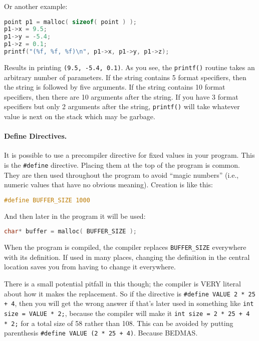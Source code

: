 Or another example:
\begin{lstlisting}[language=C]
point p1 = malloc( sizeof( point ) );
p1->x = 9.5;
p1->y = -5.4;
p1->z = 0.1;
printf("(%f, %f, %f)\n", p1->x, p1->y, p1->z);
\end{lstlisting}

Results in printing \texttt{(9.5, -5.4, 0.1)}. As you see, the \texttt{printf()} routine takes an arbitrary number of parameters. If the string contains 5 format specifiers, then the string is followed by five arguments. If the string contains 10 format specifiers, then there are 10 arguments after the string. If you have 3 format specifiers but only 2 arguments after the string, \texttt{printf()} will take whatever value is next on the stack which may be garbage.

\paragraph{Define Directives.}

It is possible to use a precompiler directive for fixed values in your program. This is the \texttt{\#define} directive. Placing them at the top of the program is common. They are then used throughout the program to avoid ``magic numbers'' (i.e., numeric values that have no obvious meaning). Creation is like this:

\begin{lstlisting}[language=C]
#define BUFFER_SIZE 1000
\end{lstlisting}

And then later in the program it will be used:

\begin{lstlisting}[language=C]
char* buffer = malloc( BUFFER_SIZE );
\end{lstlisting}

When the program is compiled, the compiler replaces \texttt{BUFFER\_SIZE} everywhere with its definition. If used in many places, changing the definition in the central location saves you from having to change it everywhere.

There is a small potential pitfall in this though; the compiler is VERY literal about how it makes the replacement. So if the directive is \texttt{\#define VALUE 2 * 25 + 4}, then you will get the wrong answer if that's later used in something like \texttt{int size = VALUE * 2;}, because the compiler will make it \texttt{int size = 2 * 25 + 4 * 2;} for a total size of 58 rather than 108. This can be avoided by putting parenthesis \texttt{\#define VALUE (2 * 25 + 4)}. Because BEDMAS.

